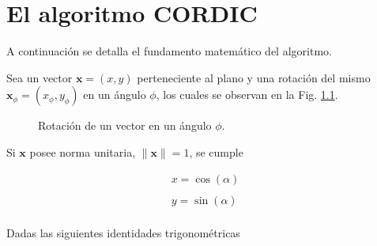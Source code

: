 \chapter{El algoritmo CORDIC}
\label{cap:apC}

A continuación se detalla el fundamento matemático del algoritmo.

Sea un vector $\textbf{x}=(x,y)$ perteneciente al plano y una rotación del mismo $\mathbf{x}_{\phi}=(x_{\phi},y_{\phi})$
en un ángulo $\phi$, los cuales se observan en la Fig. \ref{vectorrotacion}.

\begin{figure}[htpb]
\begin{center}
\caption{Rotación de un vector en un ángulo $\phi$.}
\label{vectorrotacion}
\end{center}
\end{figure}

Si $\textbf{x}$ posee norma unitaria, $\|\mathbf{x}\|=1$, se cumple

\begin{equation}
\begin{array}{l}
x=\cos(\alpha)\\
\\
y=\sin(\alpha)\\
\end{array}
\end{equation}

Dadas las siguientes identidades trigonométricas 

